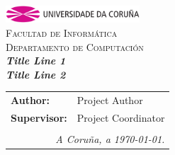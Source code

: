 \begin{titlepage}
\begin{center}
\includegraphics[width=5cm]{img/anagramaUDC.png}\\[0.5cm]
{\textsc{Facultad de Informática}} \\
{\large \textsc{Departamento de Computación}} \\[1cm]
{\Large \textsl{\textbf{Title Line 1}}} \\[0.15cm]
{\Large \textsl{\textbf{Title Line 2}}} \\
\vfill
\begin{flushright}
\begin{tabular}{ll}
\textbf{Author:}    & Project Author \\
\textbf{Supervisor:} & Project Coordinator \\
& \\
\multicolumn{2}{r}{\small \emph{A Coruña, a \today{}.}} \\
\end{tabular}
\end{flushright}
\end{center}
\end{titlepage}
